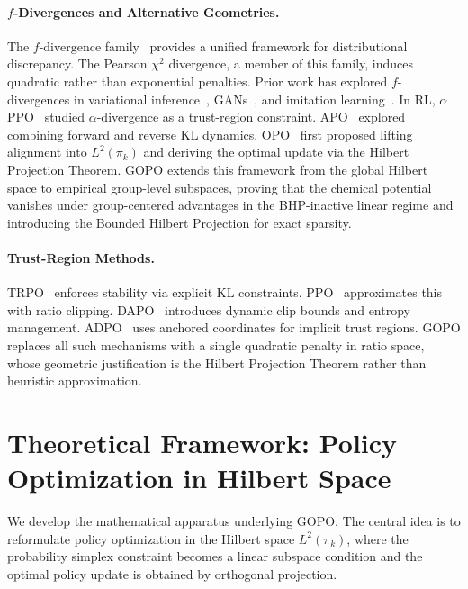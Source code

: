 \documentclass[11pt]{article}
\theoremstyle{definition}
\theoremstyle{remark}
\newcommand{\pik}{\pi_k}
\begin{document}
\paragraph{$f$-Divergences and Alternative Geometries.}
The $f$-divergence family~\cite{Csiszar1967,AliSilvey1966} provides a unified framework for distributional discrepancy. The Pearson $\chi^2$ divergence, a member of this family, induces quadratic rather than exponential penalties. Prior work has explored $f$-divergences in variational inference~\cite{Li2016Renyi}, GANs~\cite{Nowozin2016fGAN}, and imitation learning~\cite{Ghasemipour2020fIL}. In RL, $\alpha$PPO~\cite{Xu2023AlphaPPO} studied $\alpha$-divergence as a trust-region constraint. APO~\cite{zixian2025apo} explored combining forward and reverse KL dynamics. OPO~\cite{Wang2025OPO} first proposed lifting alignment into $L^2(\pik)$ and deriving the optimal update via the Hilbert Projection Theorem. GOPO extends this framework from the global Hilbert space to empirical group-level subspaces, proving that the chemical potential vanishes under group-centered advantages in the BHP-inactive linear regime and introducing the Bounded Hilbert Projection for exact sparsity.

\paragraph{Trust-Region Methods.}
TRPO~\cite{Schulman2015TRPO} enforces stability via explicit KL constraints. PPO~\cite{Schulman2017PPO} approximates this with ratio clipping. DAPO~\cite{Yu2025DAPO} introduces dynamic clip bounds and entropy management. ADPO~\cite{Wang2025ADPO} uses anchored coordinates for implicit trust regions. GOPO replaces all such mechanisms with a single quadratic penalty in ratio space, whose geometric justification is the Hilbert Projection Theorem rather than heuristic approximation.

\section{Theoretical Framework: Policy Optimization in Hilbert Space}
\label{sec:framework}

We develop the mathematical apparatus underlying GOPO. The central idea is to reformulate policy optimization in the Hilbert space $L^2(\pik)$, where the probability simplex constraint becomes a linear subspace condition and the optimal policy update is obtained by orthogonal projection.
\end{document}
